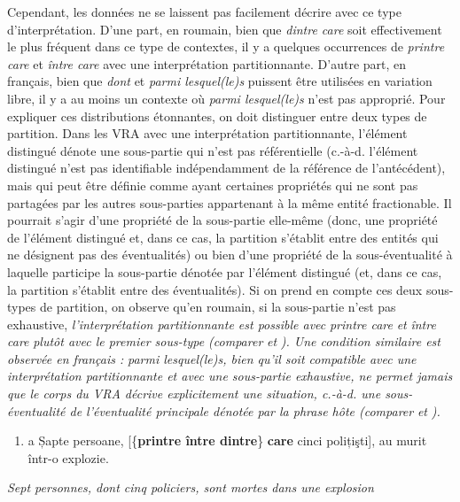 Cependant, les données ne se laissent pas facilement décrire avec ce type d'interprétation. D'une part, en roumain, bien que \textit{dintre care} soit effectivement le plus fréquent dans ce type de contextes, il y a quelques occurrences de \textit{printre care} et \textit{între care} avec une interprétation partitionnante. D'autre part, en français, bien que \textit{dont} et \textit{parmi lesquel(le)s} puissent être utilisées en variation libre, il y a au moins un contexte où \textit{parmi lesquel(le)s} n'est pas approprié. Pour expliquer ces distributions étonnantes, on doit distinguer entre deux types de partition. Dans les VRA avec une interprétation partitionnante, l'élément distingué dénote une sous-partie qui n'est pas référentielle (c.-à-d. l'élément distingué n'est pas identifiable indépendamment de la référence de l'antécédent), mais qui peut être définie comme ayant certaines propriétés qui ne sont pas partagées par les autres sous-parties appartenant à la même entité fractionable. Il pourrait s'agir d'une propriété de la sous-partie elle-même (donc, une propriété de l'élément distingué et, dans ce cas, la partition s'établit entre des entités qui ne désignent pas des éventualités) ou bien d'une propriété de la sous-éventualité à laquelle participe la sous-partie dénotée par l'élément distingué (et, dans ce cas, la partition s'établit entre des éventualités). Si on prend en compte ces deux sous-types de partition, on observe qu'en roumain, si la sous-partie n'est pas exhaustive, \emph{\textup{l'interprétation partitionnante est possible avec} }\emph{printre care} \emph{\textup{et} }\emph{între care}\emph{\textup{ plutôt avec le premier sous-type (comparer} }\emph{\textup{}}\emph{\textup{ et} }\emph{\textup{}}\emph{\textup{). Une condition similaire est observée en français :} }\emph{parmi lesquel(le)s}\emph{\textup{, bien qu'il soit compatible avec une interprétation partitionnante et avec une sous-partie exhaustive, ne permet jamais que le corps du VRA décrive explicitement une situation, c.-à-d. une sous-éventualité de l'éventualité principale dénotée par la phrase hôte (comparer} }\emph{\textup{}}\emph{\textup{ et} }\emph{\textup{}}\emph{\textup{).}}


\begin{enumerate}
\item \label{bkm:Ref295319048}a  Șapte persoane, [\{\textbf{printre {\textbar} între {\textbar} dintre}\} \textbf{care} cinci polițişti], au murit într-o explozie.  


\end{enumerate}
{\itshape
Sept personnes, dont cinq policiers, sont mortes dans une explosion}

